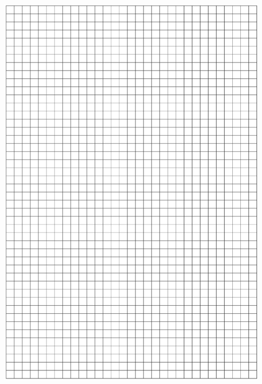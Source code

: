 \documentclass[10pt]{article}
\begin{document}
\includegraphics[max width=\textwidth, center]{2024_11_21_1e89351873aa60c4c1b9g-09}
\end{document}
